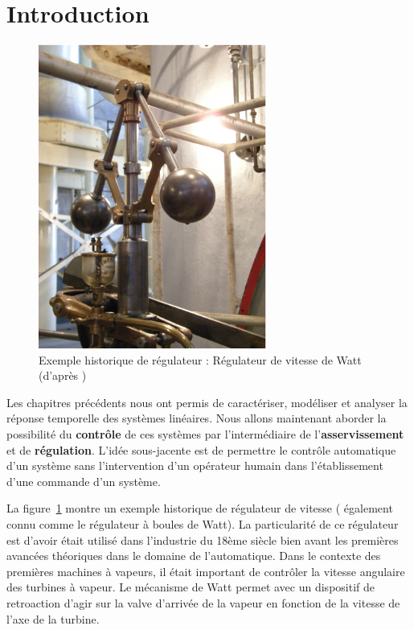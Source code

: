 \section{Introduction}
\begin{figure}[!h]
    \centering
    \includegraphics[width=0.45\linewidth,height=10cm]
    {fig/Georgetown_PowerPlant_Museum_m.eps}
    \caption{Exemple historique de régulateur : Régulateur 
             de vitesse de Watt (d'après \cite{watt})\label{fig-hist}}
\end{figure}
Les chapitres précédents nous ont permis de caractériser, modéliser et
analyser la réponse temporelle des systèmes linéaires.
Nous allons maintenant aborder la possibilité du \textbf{contrôle} de ces 
systèmes par l'intermédiaire de l'\textbf{asservissement} et de 
\textbf{régulation}. 
L'idée sous-jacente est de permettre le contrôle automatique d'un système
sans l'intervention d'un opérateur humain dans l'établissement d'une commande
d'un système. 

La figure~\ref{fig-hist} montre un exemple historique de régulateur de 
vitesse ( également connu comme le régulateur à boules de Watt). 
La particularité de ce régulateur est d'avoir était utilisé dans l'industrie
du 18ème siècle bien avant les premières avancées théoriques dans le domaine 
de l'automatique. Dans le contexte des premières machines à vapeurs, 
il était important de contrôler la vitesse angulaire des turbines à vapeur. 
Le mécanisme de Watt permet avec un dispositif de retroaction d'agir sur la 
valve d'arrivée de la vapeur en fonction de la vitesse de l'axe de la turbine.

